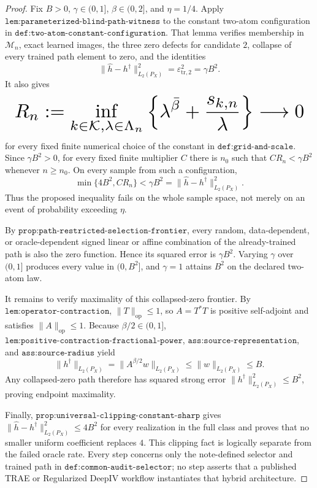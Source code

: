 \documentclass{article}
\begin{document}
\begin{proof}
Fix \(B>0\), \(\gamma\in(0,1]\), \(\beta\in(0,2]\), and \(\eta=1/4\). Apply \(\texttt{lem:parameterized-blind-path-witness}\) to the constant two-atom configuration in \(\texttt{def:two-atom-constant-configuration}\). That lemma verifies membership in \(\mathcal M_n\), exact learned images, the three zero defects for candidate \(2\), collapse of every trained path element to zero, and the identities
\[
 \|\widehat h-h^\dagger\|_{L_2(P_X)}^2
 =\varepsilon_{\mathrm{tr},2}^2
 =\gamma B^2.
\]
It also gives
\[
\makebox[\linewidth][c]{\resizebox{0.98\linewidth}{!}{\(\displaystyle R_n:=\inf_{k\in\mathcal K,\lambda\in\Lambda_n}
 \left\{\lambda^{\bar\beta}+\frac{s_{k,n}}{\lambda}\right\}
 \longrightarrow0\)}}
\]
for every fixed finite numerical choice of the constant in \(\texttt{def:grid-and-scale}\). Since \(\gamma B^2>0\), for every fixed finite multiplier \(C\) there is \(n_0\) such that \(CR_n<\gamma B^2\) whenever \(n\ge n_0\). On every sample from such a configuration,
\[
 \min\{4B^2,CR_n\}<\gamma B^2
 =\|\widehat h-h^\dagger\|_{L_2(P_X)}^2.
\]
Thus the proposed inequality fails on the whole sample space, not merely on an event of probability exceeding \(\eta\).

By \(\texttt{prop:path-restricted-selection-frontier}\), every random, data-dependent, or oracle-dependent signed linear or affine combination of the already-trained path is also the zero function. Hence its squared error is \(\gamma B^2\). Varying \(\gamma\) over \((0,1]\) produces every value in \((0,B^2]\), and \(\gamma=1\) attains \(B^2\) on the declared two-atom law.

It remains to verify maximality of this collapsed-zero frontier. By \(\texttt{lem:operator-contraction}\), \(\|T\|_{\mathrm{op}}\le1\), so \(A=T^*T\) is positive self-adjoint and satisfies \(\|A\|_{\mathrm{op}}\le1\). Because \(\beta/2\in(0,1]\), \(\texttt{lem:positive-contraction-fractional-power}\), \(\texttt{ass:source-representation}\), and \(\texttt{ass:source-radius}\) yield
\[
 \|h^\dagger\|_{L_2(P_X)}
 =\|A^{\beta/2}w\|_{L_2(P_X)}
 \le\|w\|_{L_2(P_X)}
 \le B.
\]
Any collapsed-zero path therefore has squared strong error \(\|h^\dagger\|_{L_2(P_X)}^2\le B^2\), proving endpoint maximality.

Finally, \(\texttt{prop:universal-clipping-constant-sharp}\) gives \(\|\widehat h-h^\dagger\|_{L_2(P_X)}^2\le4B^2\) for every realization in the full class and proves that no smaller uniform coefficient replaces \(4\). This clipping fact is logically separate from the failed oracle rate. Every step concerns only the note-defined selector and trained path in \(\texttt{def:common-audit-selector}\); no step asserts that a published TRAE or Regularized DeepIV workflow instantiates that hybrid architecture.
\end{proof}
\end{document}
